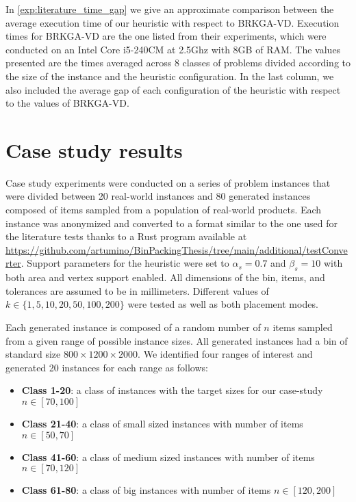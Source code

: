 In \cref{exp:literature_time_gap} we give an approximate comparison between the average execution time of our heuristic with respect to BRKGA-VD.
Execution times for BRKGA-VD are the one listed from their experiments, which were conducted on an Intel Core i5-240CM at 2.5Ghz with 8GB of RAM.
The values presented are the times averaged across 8 classes of problems divided according to the size of the instance and the heuristic configuration.
In the last column, we also included the average gap of each configuration of the heuristic with respect to the values of BRKGA-VD.
\label{exp:literature_tests}



\clearpage
\section{Case study results}
Case study experiments were conducted on a series of problem instances that were divided between 20 real-world instances and 80 generated instances composed of items sampled from a population of real-world products.
Each instance was anonymized and converted to a format similar to the one used for the literature tests thanks to a Rust program available at \url{https://github.com/artumino/BinPackingThesis/tree/main/additional/testConverter}.
Support parameters for the heuristic were set to $\alpha_s = 0.7$ and $\beta_s = 10$ with both area and vertex support enabled. All dimensions of the bin, items, and tolerances are assumed to be in millimeters.
Different values of $k \in \{1, 5, 10, 20, 50, 100, 200\}$ were tested as well as both placement modes.

Each generated instance is composed of a random number of $n$ items sampled from a given range of possible instance sizes. All generated instances had a bin of standard size $800 \times 1200 \times 2000$.
We identified four ranges of interest and generated 20 instances for each range as follows:
\begin{itemize}
    \item \textbf{Class 1-20}: a class of instances with the target sizes for our case-study $n \in [70,100]$
    \item \textbf{Class 21-40}: a class of small sized instances with number of items $n \in [50,70]$
    \item \textbf{Class 41-60}: a class of medium sized instances with number of items $n \in [70,120]$
    \item \textbf{Class 61-80}: a class of big instances with number of items $n \in [120,200]$
\end{itemize}

